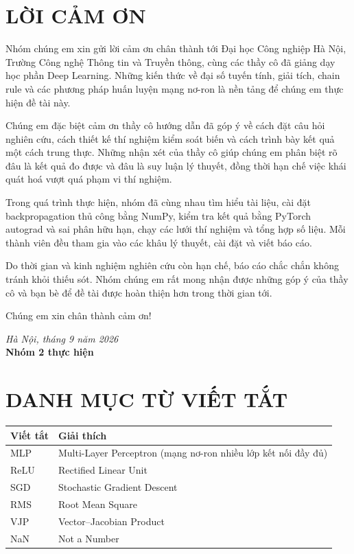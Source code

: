 \documentclass[12pt,a4paper]{report}
\begin{document}

\chapter*{LỜI CẢM ƠN}
\setlength{\parskip}{0.9em}\linespread{1.2}\selectfont
Nhóm chúng em xin gửi lời cảm ơn chân thành tới Đại học Công nghiệp Hà Nội, Trường Công nghệ Thông tin và Truyền thông, cùng các thầy cô đã giảng dạy học phần Deep Learning. Những kiến thức về đại số tuyến tính, giải tích, chain rule và các phương pháp huấn luyện mạng nơ-ron là nền tảng để chúng em thực hiện đề tài này.

Chúng em đặc biệt cảm ơn thầy cô hướng dẫn đã góp ý về cách đặt câu hỏi nghiên cứu, cách thiết kế thí nghiệm kiểm soát biến và cách trình bày kết quả một cách trung thực. Những nhận xét của thầy cô giúp chúng em phân biệt rõ đâu là kết quả đo được và đâu là suy luận lý thuyết, đồng thời hạn chế việc khái quát hoá vượt quá phạm vi thí nghiệm.

Trong quá trình thực hiện, nhóm đã cùng nhau tìm hiểu tài liệu, cài đặt backpropagation thủ công bằng NumPy, kiểm tra kết quả bằng PyTorch autograd và sai phân hữu hạn, chạy các lưới thí nghiệm và tổng hợp số liệu. Mỗi thành viên đều tham gia vào các khâu lý thuyết, cài đặt và viết báo cáo.

Do thời gian và kinh nghiệm nghiên cứu còn hạn chế, báo cáo chắc chắn không tránh khỏi thiếu sót. Nhóm chúng em rất mong nhận được những góp ý của thầy cô và bạn bè để đề tài được hoàn thiện hơn trong thời gian tới.

Chúng em xin chân thành cảm ơn!

\vspace{1cm}
\hfill{\textit{Hà Nội, tháng 9 năm 2026}}\\
\hfill{\textbf{Nhóm 2 thực hiện}}

\linespread{1.0}\selectfont\setlength{\parskip}{0.2em}
\chapter*{DANH MỤC TỪ VIẾT TẮT}
\begin{tabularx}{\textwidth}{lX}
\toprule
Viết tắt & Giải thích \\
\midrule
MLP & Multi-Layer Perceptron (mạng nơ-ron nhiều lớp kết nối đầy đủ) \\
ReLU & Rectified Linear Unit \\
SGD & Stochastic Gradient Descent \\
RMS & Root Mean Square \\
VJP & Vector--Jacobian Product \\
NaN & Not a Number \\
\bottomrule
\end{tabularx}
\end{document}
